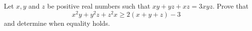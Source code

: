 Let $x,y$ and $z$ be positive real numbers such that $xy+yz+xz=3xyz$. Prove that \[ x^2y+y^2z+z^2x \ge 2(x+y+z)-3 \] and determine when equality holds.
